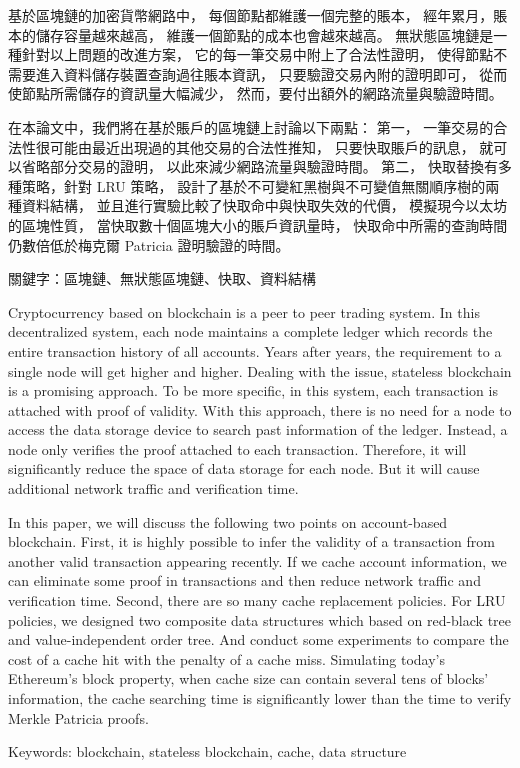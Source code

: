 \begin{abstractzh}
基於區塊鏈的加密貨幣網路中，
每個節點都維護一個完整的賬本，
經年累月，賬本的儲存容量越來越高，
維護一個節點的成本也會越來越高。
無狀態區塊鏈是一種針對以上問題的改進方案，
它的每一筆交易中附上了合法性證明，
使得節點不需要進入資料儲存裝置查詢過往賬本資訊，
只要驗證交易內附的證明即可，
從而使節點所需儲存的資訊量大幅減少，
然而，要付出額外的網路流量與驗證時間。

在本論文中，我們將在基於賬戶的區塊鏈上討論以下兩點：
第一，
一筆交易的合法性很可能由最近出現過的其他交易的合法性推知，
只要快取賬戶的訊息，
就可以省略部分交易的證明，
以此來減少網路流量與驗證時間。
第二，
快取替換有多種策略，針對 LRU 策略，
設計了基於不可變紅黑樹與不可變值無關順序樹的兩種資料結構，
並且進行實驗比較了快取命中與快取失效的代價，
模擬現今以太坊的區塊性質，
當快取數十個區塊大小的賬戶資訊量時，
快取命中所需的查詢時間仍數倍低於梅克爾 Patricia 證明驗證的時間。


\bigbreak
\noindent
關鍵字：區塊鏈、無狀態區塊鏈、快取、資料結構
\end{abstractzh}

\begin{abstracten}

Cryptocurrency based on blockchain is a peer to peer trading
system. In this decentralized system,
each node maintains a complete ledger which
records the entire transaction history of all accounts.
Years after years, the requirement to a single node will
get higher and higher. Dealing with the issue, stateless
blockchain is a promising approach. To be more specific,
in this system, each transaction is attached with proof
of validity. With this approach, there is no need for a node
to access the data storage device to search past information
of the ledger. Instead, a node only verifies the proof attached
to each transaction. Therefore, it will significantly
reduce the space of data storage for each node.
But it will cause additional network traffic and
verification time.

In this paper, we will discuss the following two points
on account-based blockchain.
First,
it is highly possible to infer the validity of
a transaction from another valid transaction appearing recently.
If we cache account information, we can eliminate some
proof in transactions and then reduce network traffic
and verification time.
Second,
there are so many cache replacement policies.
For LRU policies, we designed two composite data
structures which based on red-black tree and value-independent order tree.
And conduct some experiments to compare the cost of a
cache hit with the penalty of a cache miss.
Simulating today's Ethereum's block property,
when cache size can contain several tens of blocks' information,
the cache searching time is significantly lower than
the time to verify Merkle Patricia proofs.

\bigbreak
\noindent
Keywords: blockchain, stateless blockchain, cache, data structure
\end{abstracten}

